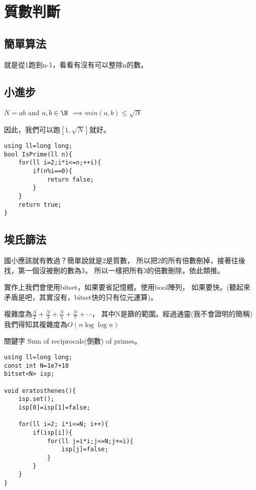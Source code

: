 \section{質數判斷}
    \subsection{簡單算法}
    就是從1跑到n-1，看看有沒有可以整除n的數。

    \subsection{小進步}

    \begin{theorem}
        $N = ab$ and  $a,b \in \N$
        $\implies min(a,b) \leq \sqrt{N}$
    \end{theorem}

    因此，我們可以跑$[1,\sqrt{N}]$就好。

\begin{lstlisting}[caption=$\sqrt{N}$ 質數判斷]
using ll=long long;
bool IsPrime(ll n){
    for(ll i=2;i*i<=n;++i){
        if(n%i==0){
            return false;
        }
    }
    return true;
}
\end{lstlisting}

    \subsection{埃氏篩法}
    國小應該就有教過？簡單說就是2是質數，
    所以把2的所有倍數刪掉，接著往後找，第一個沒被刪的數為3，
    所以一樣把所有3的倍數刪除，依此類推。

    實作上我們會使用bitset，如果要省記憶體。使用bool陣列，
    如果要快。(聽起來矛盾是吧，其實沒有，bitset快的只有位元運算)。

    複雜度為$\frac{N}{2} + \frac{N}{3} + \frac{N}{5} + \frac{N}{7} + \cdots$，
    其中N是篩的範圍。經過通靈(我不會證明的簡稱)我們得知其複雜度為$O(n \log{\log{n}})$

    關鍵字 Sum of reciprocals(倒數) of primes。

\begin{lstlisting}[caption=埃氏篩法]
using ll=long long;
const int N=1e7+10
bitset<N> isp;

void eratosthenes(){
    isp.set();
    isp[0]=isp[1]=false;
    
    for(ll i=2; i*i<=N; i++){
        if(isp[i]){
            for(ll j=i*i;j<=N;j+=i){
                isp[j]=false;
            }
        }     
    }
}
\end{lstlisting}

